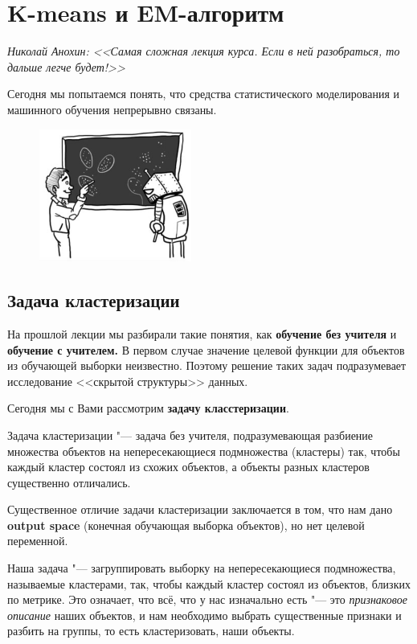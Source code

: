 \section{K-means и EM-алгоритм}
{\it Николай Анохин: <<Самая сложная лекция курса. Если в ней разобраться, то дальше легче будет!>>}

 Сегодня мы попытаемся понять, что средства статистического моделирования и машинного обучения непрерывно связаны. 

\begin{figure}[H]
\centering
    \includegraphics[width=50mm]{images/img1.png}
\end{figure}

\subsection{Задача кластеризации}

На прошлой лекции мы разбирали такие понятия, как {\bf обучение без учителя} и {\bf обучение с учителем.} В первом случае значение целевой функции для объектов из обучающей выборки неизвестно. Поэтому решение таких задач подразумевает исследование <<скрытой структуры>> данных. 

Сегодня мы с Вами рассмотрим {\bf задачу класстеризации}.
\begin{Def}{Задача кластеризации}
"--- задача без учителя, подразумевающая разбиение множества объектов на непересекающиеся подмножества (кластеры) так, чтобы каждый кластер состоял из схожих объектов, а объекты разных кластеров существенно отличались.
\end{Def}


Существенное отличие задачи кластеризации заключается в том, что нам дано {\bf output space} (конечная обучающая выборка объектов), но нет целевой переменной.

Наша задача "--- загруппировать выборку на непересекающиеся подмножества, называемые кластерами, так, чтобы каждый кластер состоял из объектов, близких по метрике. 
Это означает, что всё, что у нас изначально есть "--- это {\it признаковое описание} наших объектов, и нам необходимо выбрать существенные признаки и разбить на группы, то есть кластеризовать, наши объекты.

